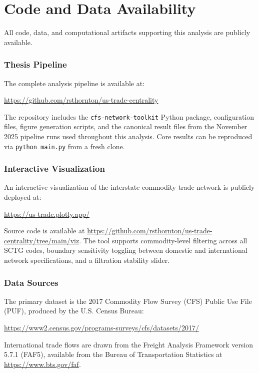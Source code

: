 \documentclass[12pt,oneside]{book}
\begin{document}
\chapter{Code and Data Availability}                                          
\label{appendix:code}                                                       
All code, data, and computational artifacts supporting this analysis are publicly available.                                                       
\subsection*{Thesis Pipeline}          

The complete analysis pipeline is available at:
\begin{center}
\url{https://github.com/rsthornton/us-trade-centrality}
\end{center}
The repository includes the \texttt{cfs-network-toolkit} Python package, 
configuration files, figure generation scripts, and the canonical result files from the November 2025 pipeline runs used throughout this analysis. Core results can be reproduced via \texttt{python main.py} from a fresh clone.

\subsection*{Interactive Visualization}

An interactive visualization of the interstate commodity trade network is publicly deployed at:

\begin{center}
\url{https://us-trade.plotly.app/}
\end{center}

Source code is available at \url{https://github.com/rsthornton/us-trade-centrality/tree/main/viz}. The tool supports commodity-level filtering across all SCTG codes, boundary sensitivity toggling between domestic and international network specifications, and a filtration stability slider.

\subsection*{Data Sources}

The primary dataset is the 2017 Commodity Flow Survey (CFS) Public Use File (PUF), produced by the U.S. Census Bureau:

\begin{center}
\url{https://www2.census.gov/programs-surveys/cfs/datasets/2017/}
\end{center}
International trade flows are drawn from the Freight Analysis Framework 
version 5.7.1 (FAF5), available from the Bureau of Transportation Statistics at \url{https://www.bts.gov/faf}.

\backmatter
{}
\begin{singlespace}
\begin{sloppypar}
\setlength{\bibsep}{12pt}


\end{sloppypar}
\end{singlespace}
\end{document}
